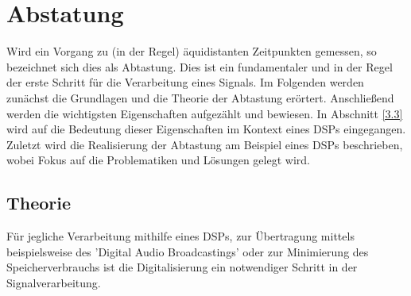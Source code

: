 \section{Abstatung}\label{3}
Wird ein Vorgang zu (in der Regel) äquidistanten Zeitpunkten gemessen, so bezeichnet sich dies als Abtastung. Dies ist ein fundamentaler und in der Regel der erste Schritt für die Verarbeitung eines Signals. Im Folgenden werden zunächst die Grundlagen und die Theorie der Abtastung erörtert. Anschließend werden die wichtigsten Eigenschaften aufgezählt und bewiesen. In Abschnitt \ref{3.3} wird auf die Bedeutung dieser Eigenschaften im Kontext eines DSPs eingegangen. Zuletzt wird die Realisierung der Abtastung am Beispiel eines DSPs beschrieben, wobei Fokus auf die Problematiken und Lösungen gelegt wird.
\subsection{Theorie}\label{3.1}
Für jegliche Verarbeitung mithilfe eines DSPs, zur Übertragung mittels beispielsweise des 'Digital Audio Broadcastings' oder zur Minimierung des Speicherverbrauchs ist die Digitalisierung ein notwendiger Schritt in der Signalverarbeitung. 

